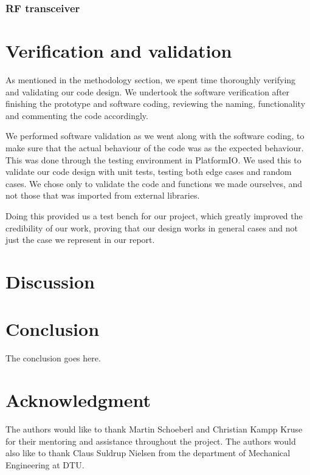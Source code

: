 \documentclass[conference]{IEEEtran}
\begin{document}
\subsubsection{RF transceiver}

\section{Verification and validation} %
As mentioned in the methodology section, we spent time thoroughly verifying and validating our code design. We undertook the software verification after finishing the prototype and software coding, reviewing the naming, functionality and commenting the code accordingly.

We performed software validation as we went along with the software coding, to make sure that the actual behaviour of the code was as the expected behaviour. This was done through the testing environment in PlatformIO. We used this to validate our code design with unit tests, testing both edge cases and random cases. We chose only to validate the code and functions we made ourselves, and not those that was imported from external libraries.

Doing this provided us a test bench for our project, which greatly improved the credibility of our work, proving that our design works in general cases and not just the case we represent in our report.

\section{Discussion}
% 

\section{Conclusion}
The conclusion goes here.



\section*{Acknowledgment}
The authors would like to thank Martin Schoeberl and Christian Kampp Kruse for their mentoring and assistance throughout the project. The authors would also like to thank Claus Suldrup Nielsen from the department of Mechanical Engineering at DTU.



\end{document}
